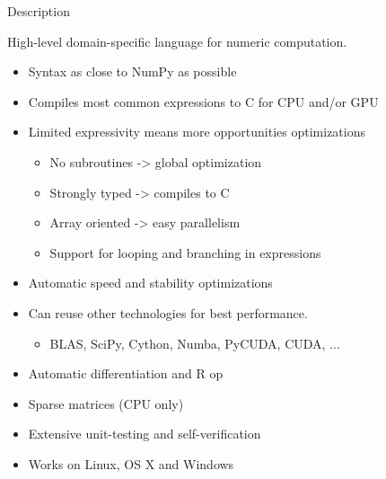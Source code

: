 \documentclass[utf8x,xcolor=pdftex,dvipsnames,table]{beamer}
\begin{document}
\begin{frame}{Description}

  High-level domain-specific language for numeric computation.

  \begin{itemize}
    \item Syntax as close to NumPy as possible
    \item Compiles most common expressions to C for CPU and/or GPU
    \item Limited expressivity means more opportunities optimizations
    \begin{itemize}
      \item No subroutines -> global optimization
      \item Strongly typed -> compiles to C
      \item Array oriented -> easy parallelism
      \item Support for looping and branching in expressions
    \end{itemize}
    \item Automatic speed and stability optimizations
    \item Can reuse other technologies for best performance.
    \begin{itemize}
      \item BLAS, SciPy, Cython, Numba, PyCUDA, CUDA, ...
    \end{itemize}
    \item Automatic differentiation and R op
    \item Sparse matrices (CPU only)
    \item Extensive unit-testing and self-verification
    \item Works on Linux, OS X and Windows
  \end{itemize}
\end{frame}





\end{document}
